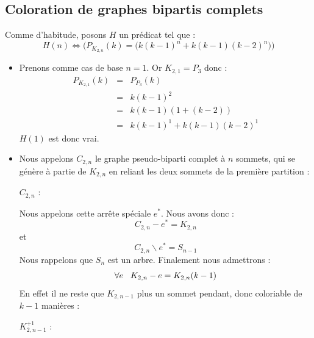 \subsection{Coloration de graphes bipartis complets}
Comme d'habitude, posons $H$ un prédicat tel que : 
\[ H(n) \Leftrightarrow \Big(P_{K_{2,n}}(k) = \big(k(k-1)^n + k(k-1)(k-2)^n\big)\Big) \]
\begin{itemize}
\item Prenons comme cas de base $n = 1$. Or $K_{2,1} = P_3$ donc :
\begin{eqnarray*}
P_{K_{2,1}}(k)			& = & P_{P_3}(k)				\\
						& = & k(k-1)^2					\\
						& = & k(k-1)(1 + (k-2))			\\
						& = & k(k-1)^1 + k(k-1)(k-2)^1	
\end{eqnarray*}
$H(1)$ est donc vrai.
\item Nous appelons $C_{2,n}$ le graphe pseudo-biparti complet à $n$ sommets, qui se génère à partie de $K_{2,n}$ en reliant les deux sommets de la première partition :

\begin{center}
$C_{2,n}$ : 
\end{center}

Nous appelons cette arrête spéciale $e^*$. Nous avons donc :
\[ C_{2,n}-e^* = K_{2,n} \]
et
\[ C_{2,n} \backslash{e^*} = S_{n-1} \]
Nous rappelons que $S_n$ est un arbre. Finalement nous admettrons :
\[ \forall{e} \hspace{3mm} K_{2,n}-e = K_{2,n}(k-1) \]
En effet il ne reste que $K_{2,n-1}$ plus un sommet pendant, donc coloriable de $k-1$ manières :

\begin{center}
$K_{2,n-1}^{+1}$ : 
\end{center}


\end{itemize}
